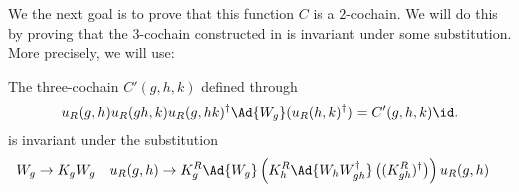 We the next goal is to prove that this function $C$ is a $2$-cochain. We will do this by proving that the $3$-cochain constructed in \cite{Ogata2d} is invariant under some substitution. More precisely, we will use:
\begin{lemma}\label{lem:3cochainIsInvariant}
	The three-cochain $C'(g,h,k)$ defined through
	\begin{equation}\label{eq:defintion3CochainProof2Cochain}
		u_R(g,h)u_R(gh,k)u_R(g,hk)^\dagger\Ad{W_g}(u_R(h,k)^\dagger)=C'(g,h,k)\id.
	\end{equation}
	is invariant under the substitution
	\begin{align}\label{eq:SubstitutionForProofCochain}
		W_g&\rightarrow K_g W_g&u_R(g,h)&\rightarrow K_g^R\Ad{W_g}\left(K_h^R\Ad{W_hW_{gh}^\dagger}\left((K_{gh}^R)^\dagger\right)\right)u_
		R(g,h)
	\end{align}
\end{lemma}
